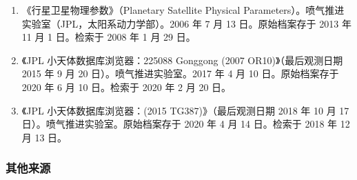\begin{enumerate}
\item 《行星卫星物理参数》（Planetary Satellite Physical Parameters）。喷气推进实验室（JPL，太阳系动力学部）。2006 年 7 月 13 日。原始档案存于 2013 年 11 月 1 日。检索于 2008 年 1 月 29 日。
\item 《JPL 小天体数据库浏览器：225088 Gonggong (2007 OR10)》（最后观测日期 2015 年 9 月 20 日）。喷气推进实验室。2017 年 4 月 10 日。原始档案存于 2020 年 6 月 10 日。检索于 2020 年 2 月 20 日。
\item 《JPL 小天体数据库浏览器：(2015 TG387)》（最后观测日期 2018 年 10 月 17 日）。喷气推进实验室。原始档案存于 2020 年 4 月 14 日。检索于 2018 年 12 月 13 日。
\end{enumerate}
\subsubsection{其他来源}
